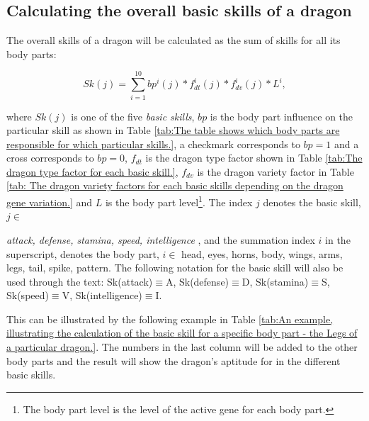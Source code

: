 \documentclass[12pt]{article}
\begin{document}
\subsection{Calculating the overall basic skills of a dragon}
\label{Calculating the overall basic skills of a dragon}  \par

The overall skills of a dragon will be calculated as the sum of skills for all its body parts:
\begin{center}
   \begin{equation}
   \label{Eq:Sk}
      Sk(j) = \sum_{i=1}^{10} bp^i(j)*f_{dt}^i(j)*f_{dv}^i(j)*L^i,
   \end{equation}
\end{center}
where  $Sk(j)$  is one of the five \textit{basic skills}, $bp$  is the body part influence on the particular skill as shown in  Table \ref{tab:The table shows which body parts are responsible for which particular skills.}, a checkmark corresponds to $bp=1$ and a cross corresponds to $bp=0$,   $f_{dt}$  is the dragon type factor shown in  Table \ref{tab:The dragon type factor for each basic skill.},  $f_{dv}$  is the dragon variety factor in  Table \ref{tab: The dragon variety factors for each basic skills depending on the dragon gene variation.} and $L$ is the body part level\footnote{The body part level is the level of the active gene for each body part.}. The index  $j$ denotes the basic skill,  $j \in$ {\textit{attack, defense, stamina, speed, intelligence} , and the summation index $i$  in the superscript, denotes the body part,  $i \in$ {head, eyes, horns, body, wings, arms, legs, tail, spike, pattern}. The following notation for the basic skill will also be used through the text: Sk(attack)$\equiv$A, Sk(defense)$\equiv$D, Sk(stamina)$\equiv$S, Sk(speed)$\equiv$V, Sk(intelligence)$\equiv$I.\par 

This can be illustrated by the following example in  Table \ref{tab:An example, illustrating the calculation of the basic skill for a specific body part - the Legs of a particular dragon.}.  The numbers in the last column will be added to the other body parts and the result will show the dragon’s aptitude for in the different basic skills.

}
\end{document}

